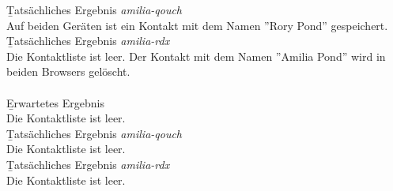 \b{Tatsächliches Ergebnis \it{amilia-qouch}}\\
Auf beiden Geräten ist ein Kontakt mit dem Namen ''Rory Pond'' gespeichert.\\
\b{Tatsächliches Ergebnis \it{amilia-rdx}}\\
Die Kontaktliste ist leer.
%
Der Kontakt mit dem Namen ''Amilia Pond'' wird in beiden Browsers gelöscht.\\\\
\b{Erwartetes Ergebnis}\\
Die Kontaktliste ist leer.\\
\b{Tatsächliches Ergebnis \it{amilia-qouch}}\\
Die Kontaktliste ist leer.\\
\b{Tatsächliches Ergebnis \it{amilia-rdx}}\\
Die Kontaktliste ist leer.